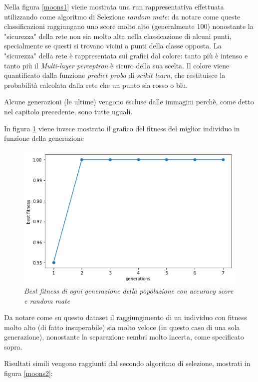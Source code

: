\documentclass[12pt,a4paper]{report}
\begin{document}
Nella figura \ref{moons1} viene mostrata una run rappresentativa effettuata utilizzando come algoritmo di Selezione \textit{random mate}: da notare come queste classificazioni raggiungano uno score molto alto (generalmente 100\textdiscount) nonostante la "sicurezza" della rete non sia molto alta nella classicazione di alcuni punti, specialmente se questi si trovano vicini a punti della classe opposta.
La "sicurezza" della rete è rappresentata sui grafici dal colore: tanto più è intenso e tanto  più il \textit{Multi-layer perceptron} è sicuro della sua scelta.
Il colore viene quantificato dalla funzione \textit{predict proba} di \textit{scikit learn}, che restituisce la probabilità calcolata dalla rete che un punto sia rosso o blu.

Alcune generazioni (le ultime) vengono escluse dalle immagini perchè, come detto nel capitolo precedente, sono tutte uguali.

In figura \ref{best1} viene invece mostrato il grafico del fitness del miglior individuo in funzione della generazione

\begin{figure}[H]
 \centering
 \includegraphics[scale = 0.4]{images/moons-rnd-acc./best}
 \caption{\textit{Best fitness di ogni generazione della popolazione con accuracy score e random mate}}
 \label{best1}
\end{figure}

Da notare come su questo dataset il raggiungimento di un individuo con fitness molto alto (di fatto insuperabile) sia molto veloce (in questo caso di una sola generazione), nonostante la separazione sembri molto incerta, come specificato sopra.

Risultati simili vengono raggiunti dal secondo algoritmo di selezione, mostrati in figura \ref{moons2}:
\end{document}
